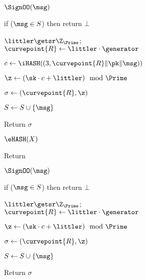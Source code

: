 	\begin{figure}[t]
		{
		
		\begin{oracle}{$\SignOO(\msg)$}
			\item if ($\msg \in S$) then return $\bot$
				
				\item $\littler \getsr \Z_{\Prime}$; $\curvepoint{R} \gets \littler\cdot \generator$
				\item $c \gets 
			\iHASH((3,\curvepoint{R}\|\pk\|\msg))$
				
				\item $\z \gets (\sk \cdot c + \littler) \mod \Prime$
				\item $\sigma \gets (\curvepoint{R},\z)$
				\item $S \gets S \cup \{\msg\}$
				\item Return $\sigma$
		\end{oracle}
		\ExptSepSpace
		\begin{oracle}{$\eHASH(X)$}
			\item Return 
		\end{oracle}
    	\ExptSepSpace
		}
		{
			
			\begin{oracle}{$\SignOO(\msg)$}
				\item if ($\msg \in S$) then return $\bot$
				\item $\littler \getsr \Z_{\Prime}$; $\curvepoint{R} \gets \littler\cdot \generator$
				\item {}
				\item \quad {}
				\item {}
				\item $\z \gets (\sk \cdot c + \littler) \mod \Prime$
				\item $\sigma \gets (\curvepoint{R},\z)$
				\item $S \gets S \cup \{\msg\}$
				\item Return $\sigma$
			\end{oracle}
			\ExptSepSpace
			
}
\end{figure}
